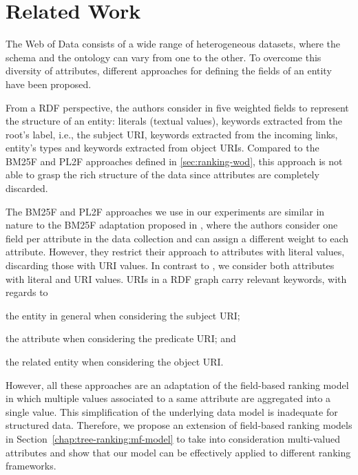 \section{Related Work}
\label{sec:searching:relwork}

The Web of Data consists of a wide range of heterogeneous datasets, where the schema and the ontology can vary from one to the other. To overcome this diversity of attributes, different approaches for defining the fields of an entity have been proposed.

From a RDF perspective, the authors consider in \cite{Perez-Aguera:2010:UBS} five weighted fields to represent the structure of an entity: literals (textual values), keywords extracted from the root's label, i.e., the subject URI, keywords extracted from the incoming links, entity's types and keywords extracted from object URIs. Compared to the BM25F and PL2F approaches defined in \ref{sec:ranking-wod}, this approach is not able to grasp the rich structure of the data since attributes are completely discarded.

The BM25F and PL2F approaches we use in our experiments are similar in nature to the BM25F adaptation proposed in \cite{blanco:2011:iswc}, where the authors consider one field per attribute in the data collection and can assign a different weight to each attribute. However, they restrict their approach to attributes with literal values, discarding those with URI values. In contrast to \cite{blanco:2011:iswc}, we consider both attributes with literal and URI values. URIs in a RDF graph carry relevant keywords, with regards to
\begin{inparaenum}[(1)]
	\item the entity in general when considering the subject URI;
	\item the attribute when considering the predicate URI; and
	\item the related entity when considering the object URI.
\end{inparaenum}

However, all these approaches are an adaptation of the field-based ranking model in which multiple values associated to a same attribute are aggregated into a single value. This simplification of the underlying data model is inadequate for structured data. Therefore, we propose an extension of field-based ranking models in Section~\ref{chap:tree-ranking:mf-model} to take into consideration multi-valued attributes and show that our model can be effectively applied to different ranking frameworks.

